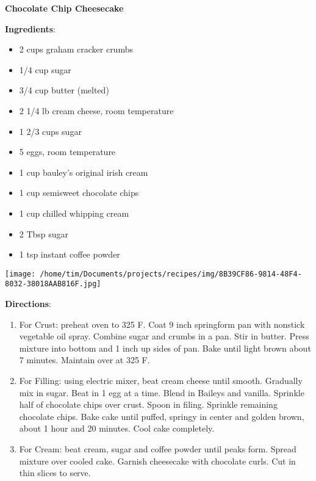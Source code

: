 \documentclass[11pt, twoside, openany]{book}
\begin{document}
\noindent\begin{minipage}[t]{\linewidth}%
{\Large\textbf{Chocolate Chip Cheesecake}} \label{chocolate-chip-cheesecake}\hfill\textit{}\\
\noindent\begin{minipage}[t]{0.78\linewidth}%
\textbf{Ingredients}:\vspace{-3mm}
\begin{multicols}{2}
\begin{itemize}\setlength\itemsep{-1mm}
\item 2 cups graham cracker crumbs
\item 1/4 cup sugar
\item 3/4 cup butter (melted)
\item 2 1/4 lb cream cheese, room temperature
\item 1 2/3 cups sugar
\item 5 eggs, room temperature
\item 1 cup bauley's original irish cream
\item 1 cup semisweet chocolate chips
\item 1 cup chilled whipping cream
\item 2 Tbsp sugar
\item 1 tsp instant coffee powder
\end{itemize}
\end{multicols}
\end{minipage}
\noindent\begin{minipage}[t]{0.18\linewidth}
\centering \strut\vspace*{-\baselineskip}\newline
\texttt{[image: /home/tim/Documents/projects/recipes/img/8B39CF86-9814-48F4-8032-38018AAB816F.jpg]}\\
\end{minipage}\vspace{3mm}
\textbf{Directions}:
\vspace{-3mm}\begin{enumerate}\setlength\itemsep{-1mm}
\item For Crust: preheat oven to 325 F. Coat 9 inch springform pan with nonstick vegetable oil spray. Combine sugar and crumbs in a pan. Stir in butter. Press mixture into bottom and 1 inch up sides of pan. Bake until light brown about 7 minutes. Maintain over at 325 F.
\item For Filling: using electric mixer, beat cream cheese until smooth. Gradually mix in sugar. Beat in 1 egg at a time. Blend in Baileys and vanilla. 
Sprinkle half of chocolate chips over crust. Spoon in filing. Sprinkle remaining chocolate chips. Bake cake until puffed, springy in center and golden brown, about 1 hour and 20 minutes. Cool cake completely. 
\item For Cream: beat cream, sugar and coffee powder until peaks form. Spread mixture over cooled cake. Garnish cheesecake with chocolate curls. Cut in thin slices to serve.
\end{enumerate}
\end{minipage}\vspace{8mm}
\end{document}
